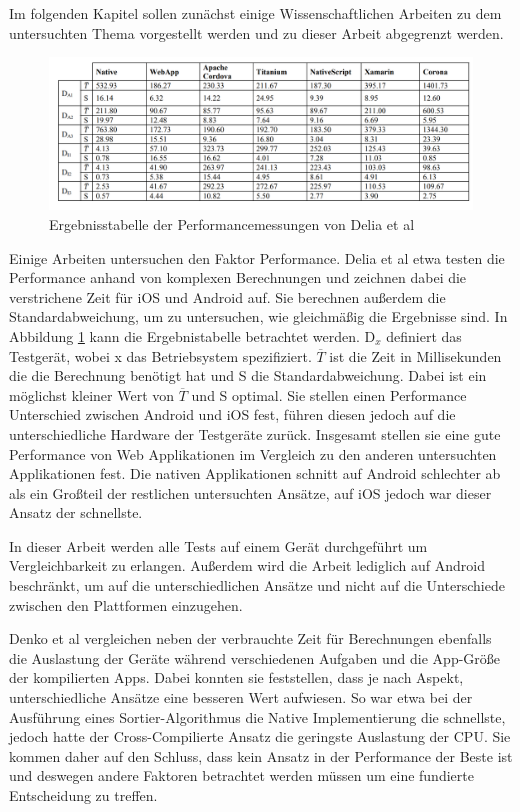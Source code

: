 Im folgenden Kapitel sollen zunächst einige Wissenschaftlichen Arbeiten zu dem untersuchten Thema vorgestellt werden und zu dieser Arbeit abgegrenzt werden.

\begin{figure}[ht]
  \centering
  \includegraphics[width=\textwidth,keepaspectratio]{images/IEEE_Delia_Al.png}
  \caption[Ergebnisstabelle der Performancemessungen von Delia et al]{Ergebnisstabelle der Performancemessungen von Delia et al \cite{IEEE_development_classes}}
  \label{fig:result_table_IEEE_related_work}
\end{figure}

Einige Arbeiten untersuchen den Faktor Performance. Delia et al \cite{IEEE_development_classes} etwa testen die Performance anhand von komplexen Berechnungen und zeichnen dabei die verstrichene Zeit für iOS und Android auf. Sie berechnen außerdem die Standardabweichung, um zu untersuchen, wie gleichmäßig die Ergebnisse sind. In Abbildung \ref{fig:result_table_IEEE_related_work} kann die Ergebnistabelle betrachtet werden. D$_x$ definiert das Testgerät, wobei x das Betriebsystem spezifiziert. $\overline T$ ist die Zeit in Millisekunden die die Berechnung benötigt hat und S die Standardabweichung. Dabei ist ein möglichst kleiner Wert von $\overline T$ und S optimal. Sie stellen einen Performance Unterschied zwischen Android und iOS fest, führen diesen jedoch auf die unterschiedliche Hardware der Testgeräte zurück. Insgesamt stellen sie eine gute Performance von Web Applikationen im Vergleich zu den anderen untersuchten Applikationen fest. Die nativen Applikationen schnitt auf Android schlechter ab als ein Großteil der restlichen untersuchten Ansätze, auf iOS jedoch war dieser Ansatz der schnellste.

In dieser Arbeit werden alle Tests auf einem Gerät durchgeführt um Vergleichbarkeit zu erlangen. Außerdem wird die Arbeit lediglich auf Android beschränkt, um auf die unterschiedlichen Ansätze und nicht auf die Unterschiede zwischen den Plattformen einzugehen.
 
Denko et al \cite{Denko_performance} vergleichen neben der verbrauchte Zeit für Berechnungen ebenfalls die Auslastung der Geräte während verschiedenen Aufgaben und die App-Größe der kompilierten Apps. Dabei konnten sie feststellen, dass je nach Aspekt, unterschiedliche Ansätze eine besseren Wert aufwiesen. So war etwa bei der Ausführung eines Sortier-Algorithmus die Native Implementierung die schnellste, jedoch hatte der Cross-Compilierte Ansatz die geringste Auslastung der CPU. Sie kommen daher auf den Schluss, dass kein Ansatz in der Performance der Beste ist und deswegen andere Faktoren betrachtet werden müssen um eine fundierte Entscheidung zu treffen.

